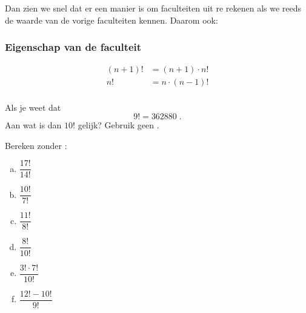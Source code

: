 \documentclass[12pt,a4paper,twoside]{article}
\begin{document}
Dan zien we snel dat er een manier is om faculteiten uit re rekenen als we reeds de waarde van de vorige faculteiten kennen. Daarom ook:

\needspace{4cm}
\subsubsection*{Eigenschap van de faculteit}
\begin{mdframed}
\begin{align*}
  (n+1)! &= (n+1) \cdot n!\\
  n!     &= n \cdot (n-1)!\\
\end{align*}
\end{mdframed}

\begin{oefening}
Als je weet dat
$$9!=362880\;.$$
Aan wat is dan $10!$ gelijk? Gebruik geen .
\end{oefening}

\begin{oefening}
Bereken zonder :
\begin{multicols}{3}
\begin{enumerate}[(a)]
  \itemsep.7em
  \item $\dfrac{17!}{14!}$
  \item $\dfrac{10!}{7!}$
  \item $\dfrac{11!}{8!}$
  \item $\dfrac{8!}{10!}$
  \item $\dfrac{3!\cdot 7!}{10!}$
  \item $\dfrac{12!-10!}{9!}$
\end{enumerate}
\end{multicols}
\end{oefening}
\end{document}
